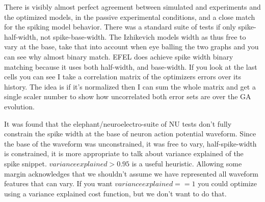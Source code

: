 There is visibly almost perfect  agreement between simulated and experiments and the optimized models, in the passive experimental conditions, and a close match for the spiking model behavior. There was a standard suite of tests if only spike-half-width, not spike-base-width. The Izhikevich models width as thus free to vary at the base, take that into account when eye balling the two graphs and you can see why almost binary match. EFEL does achieve spike width binary matching because it uses both half-width, and base-width. If you look at the last cells you can see I take a correlation matrix of the optimizers errors over its history. The idea is if it's normalized then I can sum the whole matrix and get a single scaler number to show how uncorrelated both error sets are over the GA evolution. 

It was found that the elephant/neuroelectro-suite of NU tests don't fully constrain the spike width at the base of neuron action potential waveform. Since the base of the waveform was unconstrained, it was free to vary, half-spike-width is constrained, it is more appropriate to talk about variance explained of the spike snippet. $variance explained>0.95$ is a useful heuristic. Allowing some margin acknowledges that we shouldn't assume we have represented all waveform features that can vary. If you want $variance explained==1$   
you could optimize using a variance explained 
cost function, but we don't want to do that.